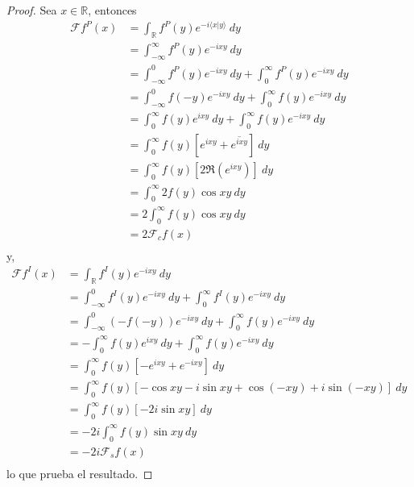 \documentclass[12pt]{report}
\theoremstyle{largebreak}
\newcommand\pint[2]{\ensuremath{\langle#1| #2\rangle}}
\newcommand\conj[1]{\ensuremath{\overline{#1}}}
\newcommand{\fou}[1]{\ensuremath{\mathcal{F}#1}}
\begin{document}
    \begin{proof}
        Sea $x\in\mathbb{R}$, entonces
        \begin{equation*}
            \begin{split}
                \fou{f^P}(x)&=\int_{\mathbb{R}} f^P(y) e^{ -i\pint{x}{y}} \:dy\\
                &=\int_{-\infty}^\infty f^P(y)e^{-ixy}\:dy\\
                &=\int_{-\infty}^0f^P(y)e^{-ixy}\:dy+\int_0^{\infty}f^P(y)e^{-ixy}\:dy \\
                &=\int_{-\infty}^0f(-y)e^{-ixy}\:dy+\int_0^{\infty}f(y)e^{-ixy}\:dy\\
                &=\int_{0}^\infty f(y)e^{ixy}\:dy+\int_0^{\infty}f(y)e^{-ixy}\:dy\\
                &=\int_{0}^\infty f(y)\left[e^{ixy}+\conj{e^{ixy}}\right] \:dy\\
                &=\int_{0}^\infty f(y)\left[2\Re(e^{ ixy}) \right] \:dy\\
                &=\int_{0}^\infty 2f(y)\cos xy \:dy\\
                &=2\int_{0}^\infty f(y)\cos xy \:dy\\
                &=2\mathcal{F}_cf(x)\\
            \end{split}
        \end{equation*}
        y,
        \begin{equation*}
            \begin{split}
                \fou{f^I}(x)&=\int_{\mathbb{R}}f^I(y)e^{ -ixy}\:dy\\
                &=\int_{-\infty}^0f^I(y)e^{ -ixy}\:dy+\int_{0}^\infty f^I(y)e^{ -ixy}\:dy\\
                &=\int_{-\infty}^0(-f(-y))e^{ -ixy}\:dy+\int_{0}^\infty f(y)e^{ -ixy}\:dy\\
                &=-\int_{0}^\infty f(y)e^{ixy}\:dy+\int_{0}^\infty f(y)e^{ -ixy}\:dy\\
                &=\int_{0}^\infty f(y)\left[-e^{ixy}+e^{-ixy}\right] \:dy\\
                &=\int_{0}^\infty f(y)\left[-\cos xy-i\sin xy+\cos(-xy)+i\sin(-xy)\right] \:dy\\
                &=\int_{0}^\infty f(y)\left[-2i\sin xy\right]\:dy\\
                &=-2i\int_{0}^\infty f(y)\sin xy\:dy\\
                &=-2i\mathcal{F}_sf(x)\\
            \end{split}
        \end{equation*}
        lo que prueba el resultado.
    \end{proof}
\end{document}
